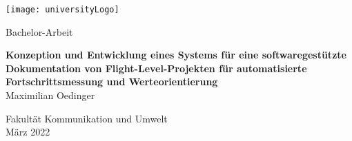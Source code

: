 \begin{titlepage}
    \begin{center}
        \begin{flushright}
        \texttt{[image: universityLogo]}\\
        
        \end{flushright}
        \vspace{3cm}
        \LARGE
        Bachelor-Arbeit\\
        \vspace{1.5cm}
        \LARGE
        
        \textbf{Konzeption und Entwicklung eines Systems für eine softwaregestützte Dokumentation von Flight-Level-Projekten für automatisierte Fortschrittsmessung und Werteorientierung 
    }\\
    
        \vspace{1cm}
        \LARGE
        Maximilian Oedinger
        
        \vfill
        \vspace{0.5cm}
        \Large
        Fakultät Kommunikation und Umwelt\\
        März 2022
        
    \end{center}
    \end{titlepage}